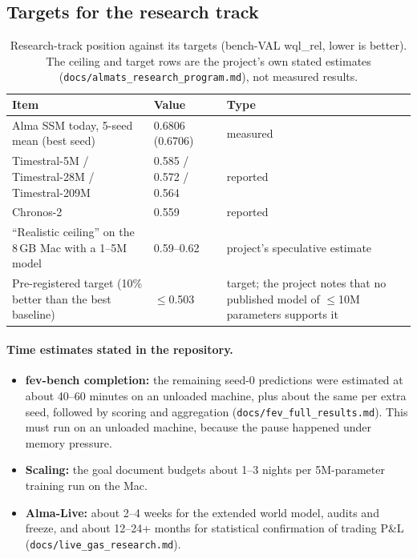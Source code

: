 \documentclass[10pt,a4paper]{article}
\newcommand{\src}[1]{{\footnotesize\texttt{#1}}}
\begin{document}
\subsection{Targets for the research track}
\begin{table}[H]
\centering\small
\caption{Research-track position against its targets (bench-VAL wql\_rel, lower is better). The ceiling and target rows are the project's own stated estimates (\src{docs/almats\_research\_program.md}), not measured results.}
\label{tab:targets}
\begin{tabularx}{\linewidth}{@{}Xlp{4.6cm}@{}}
\toprule
Item & Value & Type\\
\midrule
Alma SSM today, 5-seed mean (best seed) & 0.6806 (0.6706) & measured\\
Timestral-5M / Timestral-28M / Timestral-209M & 0.585 / 0.572 / 0.564 & reported\\
Chronos-2 & 0.559 & reported\\
``Realistic ceiling'' on the 8\,GB Mac with a 1--5M model & 0.59--0.62 & project's speculative estimate\\
Pre-registered target (10\% better than the best baseline) & $\leq$0.503 & target; the project notes that no published model of $\leq$10M parameters supports it\\
\bottomrule
\end{tabularx}
\end{table}

\paragraph{Time estimates stated in the repository.}
\begin{itemize}
\item \textbf{fev-bench completion:} the remaining seed-0 predictions were estimated at about 40--60 minutes on an unloaded machine, plus about the same per extra seed, followed by scoring and aggregation (\src{docs/fev\_full\_results.md}). This must run on an unloaded machine, because the pause happened under memory pressure.
\item \textbf{Scaling:} the goal document budgets about 1--3 nights per 5M-parameter training run on the Mac.
\item \textbf{Alma-Live:} about 2--4 weeks for the extended world model, audits and freeze, and about 12--24+ months for statistical confirmation of trading P\&L (\src{docs/live\_gas\_research.md}).
\end{itemize}
\end{document}
